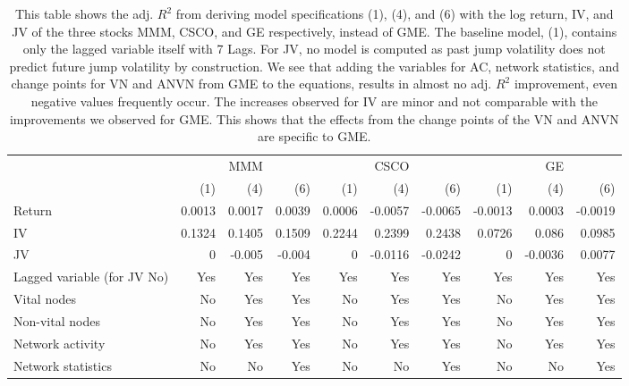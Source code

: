 \begin{table}[ht]
\centering
\caption{This table shows the adj. $R^2$ from deriving model specifications (1), (4), and (6) with the log return, IV, and JV of the three stocks 
                    MMM, CSCO, and GE respectively, instead of GME. The baseline model, (1), contains only the lagged variable itself with 7 Lags. For JV, no model is computed as past jump volatility does not predict future jump volatility by construction. We see that adding the variables for 
                    AC, network statistics, and change points for VN and ANVN from GME to the equations, results in almost no adj. $R^2$ improvement, even negative values frequently occur. 
                    The increases observed for IV are minor and not comparable with the improvements we observed for GME. This shows that the effects from the change points of the VN and ANVN
                    are specific to GME.} 
\label{table_MMM_CSCO_GE}
\begingroup\scriptsize
\begin{tabular}{l|rrr|rrr|rrr}
   \hline \hline
 &   & MMM &   &   & CSCO &   &   & GE &   \\ 
   & (1) & (4) & (6) & (1) & (4) & (6) & (1) & (4) & (6) \\  \hline
  Return & 0.0013 & 0.0017 & 0.0039 & 0.0006 & -0.0057 & -0.0065 & -0.0013 & 0.0003 & -0.0019 \\ 
  IV & 0.1324 & 0.1405 & 0.1509 & 0.2244 & 0.2399 & 0.2438 & 0.0726 & 0.086 & 0.0985 \\ 
  JV & 0 & -0.005 & -0.004 & 0 & -0.0116 & -0.0242 & 0 & -0.0036 & 0.0077 \\ 
    \hline Lagged variable (for JV No) & Yes & Yes & Yes & Yes & Yes & Yes & Yes & Yes & Yes \\ 
    Vital nodes & No & Yes & Yes & No & Yes & Yes & No & Yes & Yes \\ 
    Non-vital nodes & No & Yes & Yes & No & Yes & Yes & No & Yes & Yes \\ 
    Network activity & No & Yes & Yes & No & Yes & Yes & No & Yes & Yes \\ 
    Network statistics & No & No & Yes & No & No & Yes & No & No & Yes \\ \hline
\hline
\end{tabular}
\endgroup
\end{table}
